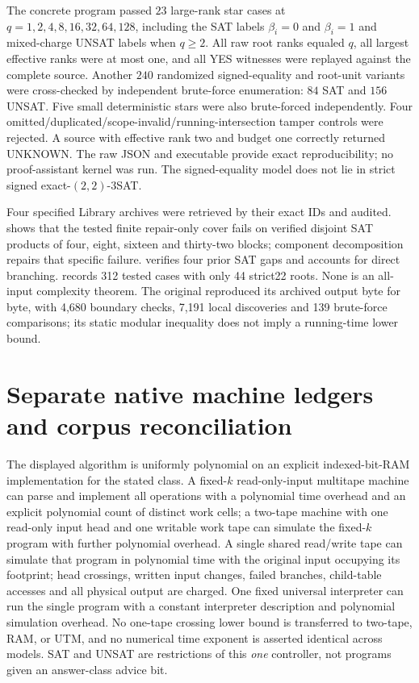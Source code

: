 \documentclass[11pt]{article}
\begin{document}
The concrete program passed $23$ large-rank star cases at $q=1,2,4,8,16,32,64,128$, including the SAT labels $\beta_i=0$ and $\beta_i=1$ and mixed-charge UNSAT labels when $q\ge2$. All raw root ranks equaled $q$, all largest effective ranks were at most one, and all YES witnesses were replayed against the complete source. Another $240$ randomized signed-equality and root-unit variants were cross-checked by independent brute-force enumeration: $84$ SAT and $156$ UNSAT. Five small deterministic stars were also brute-forced independently. Four omitted/duplicated/scope-invalid/running-intersection tamper controls were rejected. A source with effective rank two and budget one correctly returned UNKNOWN. The raw JSON and executable provide exact reproducibility; no proof-assistant kernel was run. The signed-equality model does not lie in strict signed exact-$(2,2)$-3SAT.

Four specified Library archives were retrieved by their exact IDs and audited.  shows that the tested finite repair-only cover fails on verified disjoint SAT products of four, eight, sixteen and thirty-two blocks; component decomposition repairs that specific failure.  verifies four prior SAT gaps and accounts for direct branching.  records 312 tested cases with only 44 strict22 roots. None is an all-input complexity theorem. The original  reproduced its archived output byte for byte, with 4,680 boundary checks, 7,191 local discoveries and 139 brute-force comparisons; its static modular inequality does not imply a running-time lower bound.

\section{Separate native machine ledgers and corpus reconciliation}
The displayed algorithm is uniformly polynomial on an explicit indexed-bit-RAM implementation for the stated class. A fixed-$k$ read-only-input multitape machine can parse and implement all operations with a polynomial time overhead and an explicit polynomial count of distinct work cells; a two-tape machine with one read-only input head and one writable work tape can simulate the fixed-$k$ program with further polynomial overhead. A single shared read/write tape can simulate that program in polynomial time with the original input occupying its footprint; head crossings, written input changes, failed branches, child-table accesses and all physical output are charged. One fixed universal interpreter can run the single program with a constant interpreter description and polynomial simulation overhead. No one-tape crossing lower bound is transferred to two-tape, RAM, or UTM, and no numerical time exponent is asserted identical across models. SAT and UNSAT are restrictions of this \emph{one} controller, not programs given an answer-class advice bit.
\end{document}
